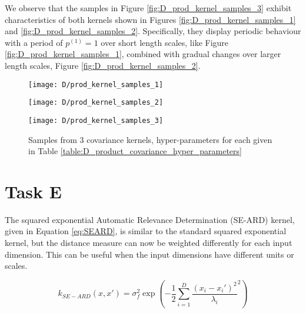 \documentclass[11pt]{article}
\begin{document}
We observe that the samples in Figure \ref{fig:D_prod_kernel_samples_3} exhibit characteristics of both kernels shown in Figures \ref{fig:D_prod_kernel_samples_1} and \ref{fig:D_prod_kernel_samples_2}. Specifically, they display periodic behaviour with a period of $p^{(1)} = 1$ over short length scales, like Figure \ref{fig:D_prod_kernel_samples_1}, combined with gradual changes over larger length scales, Figure \ref{fig:D_prod_kernel_samples_2}.


\begin{figure}[h]
    \centering
    \begin{minipage}{0.3\textwidth}
        \centering
        \texttt{[image: D/prod\_kernel\_samples\_1]} 
        \label{fig:D_prod_kernel_samples_1}
    \end{minipage}
    \begin{minipage}{0.3\textwidth}
        \centering
        \texttt{[image: D/prod\_kernel\_samples\_2]} 
        \label{fig:D_prod_kernel_samples_2}
    \end{minipage}
    \begin{minipage}{0.3\textwidth}
        \centering
        \texttt{[image: D/prod\_kernel\_samples\_3]} 
        \label{fig:D_prod_kernel_samples_3}
    \end{minipage}

    \caption{Samples from 3 covariance kernels, hyper-parameters for each given in Table \ref{table:D_product_covariance_hyper_parameters}}
    \label{fig:D_prod_kernel_samples}
\end{figure}

\section{Task E}

The squared exponential Automatic Relevance Determination (SE-ARD) kernel, given in Equation \ref{eq:SEARD}, is similar to the standard squared exponential kernel, but the distance measure can now be weighted differently for each input dimension. This can be useful when the input dimensions have different units or scales. 

\begin{equation}
    k_{SE-ARD}(x, x') = \sigma_f^2 \exp(-\frac{1}{2}\sum_{i=1}^{D} \frac{(x_i - x_i')^2}{\lambda_i}^2)
    \label{eq:SEARD}
\end{equation}
\end{document}
